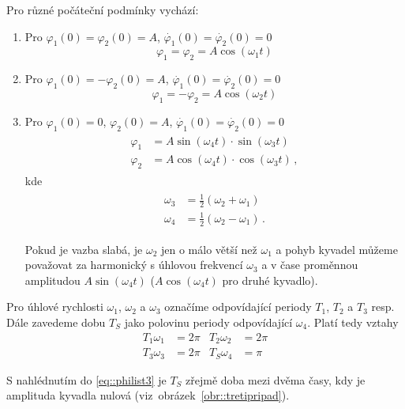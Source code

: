 Pro různé počáteční podmínky vychází:
\begin{enumerate}
\item Pro $\varphi _1 (0) = \varphi _2 (0) = A$, $\dot{\varphi_1}(0)=\dot{\varphi_2}(0)=0$
\begin{equation} \label{eq::philist1}
\varphi _1 = \varphi _2 = A \cos(\omega _1 t)
\end{equation}
\item Pro $\varphi _1 (0) = - \varphi _2 (0) = A$, $\dot{\varphi_1}(0)=\dot{\varphi_2}(0)=0$
\begin{equation} \label{eq::philist2}
\varphi _1 = - \varphi _2 = A \cos(\omega _2 t)
\end{equation}
\item Pro $\varphi _1 (0) = 0$, $\varphi _2 (0) = A$, $\dot{\varphi_1}(0)=\dot{\varphi_2}(0)=0$
\begin{align}
\label{eq::philist3}
\begin{split}
 \varphi_1 &= A \sin(\omega_4 t) \cdot \sin(\omega_3 t)
\\
 \varphi_2 &= A \cos(\omega_4 t) \cdot \cos(\omega_3 t) \,,
\end{split}
\end{align}
kde
\begin{align}
\label{eq::omega34}
\begin{split}
 \omega_3 &= \frac{1}{2}(\omega_2 + \omega_1)
\\
 \omega_4 &= \frac{1}{2}(\omega_2 - \omega_1) \,.
\end{split}
\end{align}

Pokud je vazba slabá, je $\omega _2$ jen o málo větší než $\omega_1$ a pohyb kyvadel můžeme považovat za harmonický s úhlovou frekvencí $\omega_3$ a v čase proměnnou amplitudou $A \sin(\omega_4 t)$ ($A \cos(\omega_4 t)$ pro druhé kyvadlo). 

\end{enumerate}

Pro úhlové rychlosti $\omega_1$, $\omega_2$ a $\omega_3$ označíme odpovídající periody $T_1$, $T_2$ a $T_3$ resp.
Dále zavedeme dobu $T_S$ jako polovinu periody odpovídající $\omega_4$. Platí tedy vztahy
\begin{align}
\label{eq::periodyvztahy}
 T_1 \omega_1 &= 2\pi & T_2 \omega_2 &=2\pi \nonumber \\
 T_3 \omega_3 &= 2\pi & T_S \omega_4 &=\pi
\end{align}

S nahlédnutím do \eqref{eq::philist3} je $T_S$ zřejmě doba mezi dvěma časy, kdy je amplituda kyvadla nulová (viz~obrázek~\ref{obr::tretipripad}).

